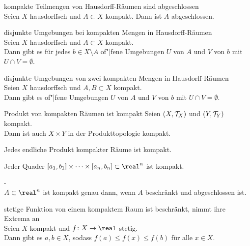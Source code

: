 \begin{Satz}{kompakte Teilmengen von Hausdorff-Räumen sind abgeschlossen}\\
    Seien $X$ hausdorffsch und $A \subset X$ kompakt.
    Dann ist $A$ abgeschlossen.
\end{Satz}

\begin{Lemma}{disjunkte Umgebungen bei kompakten Mengen in Hausdorff-Räumen}\\
    Seien $X$ hausdorffsch und $A \subset X$ kompakt. \\
    Dann gibt es für jedes $b \in X \setminus A$ of"|fene Umgebungen
    $U$ von $A$ und $V$ von $b$ mit $U \cap V = \emptyset$.
\end{Lemma}

\begin{Satz}{disjunkte Umgebungen von zwei kompakten Mengen in
             Hausdorff-Räumen}\\
    Seien $X$ hausdorffsch und $A, B \subset X$ kompakt. \\
    Dann gibt es of"|fene Umgebungen $U$ von $A$ und $V$ von $b$ mit
    $U \cap V = \emptyset$.
\end{Satz}

\linie

\begin{Satz}{Produkt von kompakten Räumen ist kompakt}
    Seien $(X, \mathcal{T}_X)$ und $(Y, \mathcal{T}_Y)$ kompakt. \\
    Dann ist auch $X \times Y$ in der Produkttopologie kompakt.
\end{Satz}

\begin{Kor}
    Jedes endliche Produkt kompakter Räume ist kompakt.
\end{Kor}

\begin{Bsp}
    Jeder Quader $[a_1, b_1] \times \dotsb \times [a_n, b_n] \subset \real^n$
    ist kompakt.
\end{Bsp}

\begin{Satz}{-}\\
    $A \subset \real^n$ ist kompakt genau dann, wenn $A$ beschränkt und
    abgeschlossen ist.
\end{Satz}

\linie

\begin{Satz}{stetige Funktion von einem kompaktem Raum ist beschränkt,
             nimmt ihre Extrema an} \\
    Seien $X$ kompakt und $f\colon X \rightarrow \real$ stetig. \\
    Dann gibt es $a, b \in X$, sodass $f(a) \le f(x) \le f(b)$ für alle
    $x \in X$.
\end{Satz}

